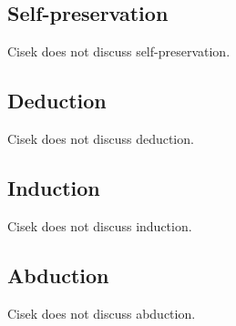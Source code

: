 \documentclass[10pt,a4paper]{article}
\begin{document}
\subsection{Self-preservation}
Cisek does not discuss self-preservation.

\subsection{Deduction}
Cisek does not discuss deduction.

\subsection{Induction}
Cisek does not discuss induction.

\subsection{Abduction}
Cisek does not discuss abduction.


\end{document}
